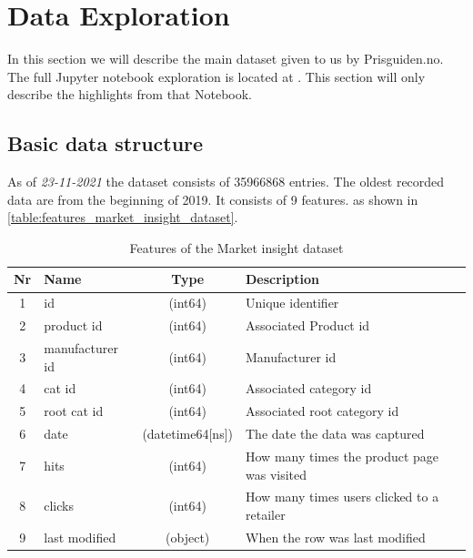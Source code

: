 \section{Data Exploration}
\label{section:Architecture:DataExploration}
In this section we will describe the main dataset given to us
by Prisguiden.no. The full Jupyter notebook exploration
is located at \cite{notebook-data-exploration}. This section will only
describe the highlights from that Notebook.

\subsection{Basic data structure}
As of \textit{23-11-2021} the dataset consists of 35966868 entries.
The oldest recorded data are from the beginning of 2019.
It consists of 9 features.
as shown in \autoref{table:features_market_insight_dataset}.
\begin{table}[htbp]
  \centering
  \caption{Features of the Market insight dataset}
  \label{table:features_market_insight_dataset}
  \begin{tabular}{|c|l|c|l|}\hline\hline
    Nr & Name            & Type             & Description                                 \\ \hline
    1  & id              & (int64)          & Unique identifier                           \\ \hline
    2  & product id      & (int64)          & Associated Product id                       \\ \hline
    3  & manufacturer id & (int64)          & Manufacturer id                             \\ \hline
    4  & cat id          & (int64)          & Associated category id                      \\ \hline
    5  & root cat id     & (int64)          & Associated root category id                 \\ \hline
    6  & date            & (datetime64[ns]) & The date the data was captured              \\ \hline
    7  & hits            & (int64)          & How many times the product page was visited \\ \hline
    8  & clicks          & (int64)          & How many times users clicked to a retailer  \\ \hline
    9  & last modified   & (object)         & When the row was last modified              \\ \hline
  \end{tabular}
\end{table}

